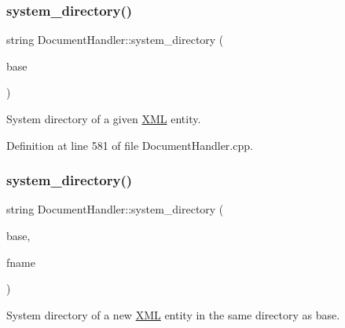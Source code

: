 \subsubsection{\texorpdfstring{system\+\_\+directory()}{system\_directory()}\hspace{0.1cm}{\footnotesize\ttfamily [1/2]}}
{\footnotesize\ttfamily string Document\+Handler\+::system\+\_\+directory (\begin{DoxyParamCaption}\item[{\hyperlink{class_d_d4hep_1_1_x_m_l_1_1_handle__t}{Handle\+\_\+t}}]{base }\end{DoxyParamCaption})\hspace{0.3cm}{\ttfamily [static]}}



System directory of a given \hyperlink{namespace_d_d4hep_1_1_x_m_l}{X\+ML} entity. 



Definition at line 581 of file Document\+Handler.\+cpp.

\hypertarget{class_d_d4hep_1_1_x_m_l_1_1_document_handler_afcb87f1aa5a2dbd771990d4e2e36a3ed}{}\label{class_d_d4hep_1_1_x_m_l_1_1_document_handler_afcb87f1aa5a2dbd771990d4e2e36a3ed} 
\subsubsection{\texorpdfstring{system\+\_\+directory()}{system\_directory()}\hspace{0.1cm}{\footnotesize\ttfamily [2/2]}}
{\footnotesize\ttfamily string Document\+Handler\+::system\+\_\+directory (\begin{DoxyParamCaption}\item[{\hyperlink{class_d_d4hep_1_1_x_m_l_1_1_handle__t}{Handle\+\_\+t}}]{base,  }\item[{const \hyperlink{namespace_d_d4hep_1_1_x_m_l_a09e5d9cc86ed782f6826dfe0778c1815}{Xml\+Char} $\ast$}]{fname }\end{DoxyParamCaption})\hspace{0.3cm}{\ttfamily [static]}}



System directory of a new \hyperlink{namespace_d_d4hep_1_1_x_m_l}{X\+ML} entity in the same directory as base. 


